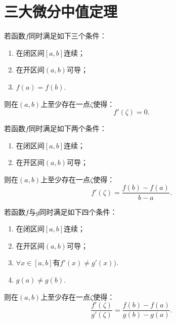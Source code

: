 \section{三大微分中值定理}

\begin{theorem}[罗尔中值定理]
	若函数$f$同时满足如下三个条件：
	\begin{enumerate}
		\item 在闭区间$[a,b]$连续；
		\item 在开区间$(a,b)$可导；
		\item $f(a)=f(b)$.
	\end{enumerate}
	则在$(a,b)$上至少存在一点$\zeta$使得：
	\begin{equation}
		f'(\zeta)=0.
	\end{equation}
\end{theorem}

\begin{theorem}[拉格朗日中值定理]
	若函数$f$同时满足如下两个条件：
	\begin{enumerate}
		\item 在闭区间$[a,b]$连续；
		\item 在开区间$(a,b)$可导；
	\end{enumerate}
	则在$(a,b)$上至少存在一点$\zeta$使得：
	\begin{equation}
		f'(\zeta)=\dfrac{f(b)-f(a)}{b-a}.
	\end{equation}
\end{theorem}

\begin{theorem}[柯西中值定理]
		若函数$f$与$g$同时满足如下四个条件：
	\begin{enumerate}
		\item 在闭区间$[a,b]$连续；
		\item 在开区间$(a,b)$可导；
		\item $\forall x\in [a,b]$有$f'(x)\neq g'(x))$.
		\item $g(a)\neq g(b)$.
	\end{enumerate}
	则在$(a,b)$上至少存在一点$\zeta$使得：
	\begin{equation}
		\dfrac{f'(\zeta)}{g'(\zeta)}=\dfrac{f(b)-f(a)}{g(b)-g(a)}.
	\end{equation}
	\end{theorem}